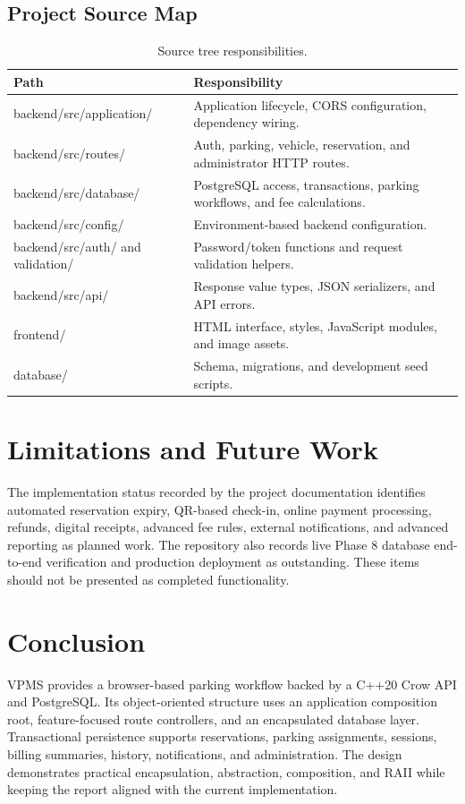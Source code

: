 \documentclass[12pt,a4paper]{article}
\begin{document}
\subsection{Project Source Map}
\begin{table}[H]
\centering\small
\begin{tabularx}{\textwidth}{@{}>{\ttfamily\raggedright\arraybackslash}p{2.2in}>{\raggedright\arraybackslash}X@{}}
\toprule
Path & Responsibility \\
\midrule
backend/src/application/ & Application lifecycle, CORS configuration, dependency wiring. \\
backend/src/routes/ & Auth, parking, vehicle, reservation, and administrator HTTP routes. \\
backend/src/database/ & PostgreSQL access, transactions, parking workflows, and fee calculations. \\
backend/src/config/ & Environment-based backend configuration. \\
backend/src/auth/ and validation/ & Password/token functions and request validation helpers. \\
backend/src/api/ & Response value types, JSON serializers, and API errors. \\
frontend/ & HTML interface, styles, JavaScript modules, and image assets. \\
database/ & Schema, migrations, and development seed scripts. \\
\bottomrule
\end{tabularx}
\caption{Source tree responsibilities.}
\label{tab:source-map}
\end{table}

\section{Limitations and Future Work}
The implementation status recorded by the project documentation identifies
automated reservation expiry, QR-based check-in, online payment processing,
refunds, digital receipts, advanced fee rules, external notifications, and
advanced reporting as planned work. The repository also records live Phase 8
database end-to-end verification and production deployment as outstanding.
These items should not be presented as completed functionality.

\section{Conclusion}
VPMS provides a browser-based parking workflow backed by a C++20 Crow API and
PostgreSQL. Its object-oriented structure uses an application composition
root, feature-focused route controllers, and an encapsulated database layer.
Transactional persistence supports reservations, parking assignments,
sessions, billing summaries, history, notifications, and administration. The
design demonstrates practical encapsulation, abstraction, composition, and
RAII while keeping the report aligned with the current implementation.
\end{document}

